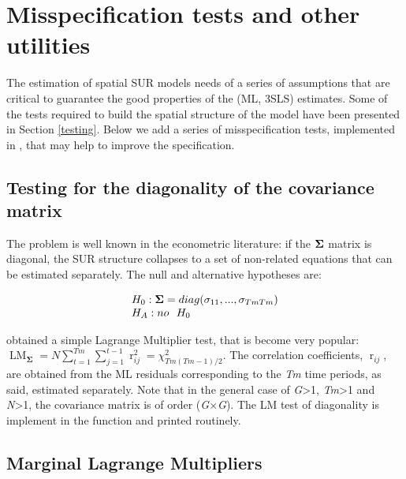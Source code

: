 \documentclass[article]{jss}
\begin{document}
\hypertarget{misspecification}{%
\section{Misspecification tests and other utilities}\label{misspecification}}

The estimation of spatial SUR models needs of a series of assumptions that are critical to guarantee the good properties of the (ML, 3SLS) estimates. Some of the tests required to build the spatial structure of the model have been presented in Section \ref{testing}. Below we add a series of misspecification tests, implemented in , that may help to improve the specification.

\hypertarget{diagonality}{%
\subsection{Testing for the diagonality of the covariance matrix}\label{diagonality}}

The problem is well known in the econometric literature: if the \textbf{$\bf \Sigma$} matrix is diagonal, the SUR structure collapses to a set of non-related equations that can be estimated separately. The null and alternative hypotheses are:

\begin{equation}
\begin{array}{ll}
H_0: {\bf \Sigma} = diag(\sigma_{11},...,\sigma_{TmTm}) \\
H_A: no \ \ H_0
\end{array}
\label{eq:BP1}
\end{equation}

\citet{BP1980} obtained a simple Lagrange Multiplier test, that is become very popular: \(\mathop{LM}\nolimits_{\boldsymbol \Sigma }^{} =N\sum _{t=1}^{Tm}\sum _{j=1}^{t-1}\mathop{r}\nolimits_{ij}^{2} = \chi^2_{Tm(Tm-1)/2}\). The correlation coefficients, \(\mathop{r}\nolimits_{ij}\), are obtained from the ML residuals corresponding to the \emph{Tm} time periods, as said, estimated separately. Note that in the general case of \emph{G}\textgreater{}1, \emph{Tm}\textgreater{}1 and \emph{N}\textgreater{}1, the covariance matrix is of order (\emph{G}\(\times\)\emph{G}). The LM test of diagonality is implement in the function  and printed routinely.

\hypertarget{marginal}{%
\subsection{Marginal Lagrange Multipliers}\label{marginal}}
\end{document}
